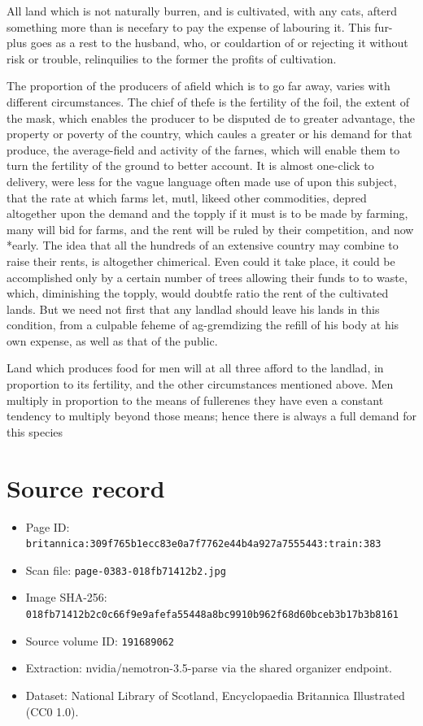 \documentclass{article}
\begin{document}
All land which is not naturally burren, and is cultivated, with any cats, afterd something more than is necefary to pay the expense of labouring it. This fur- plus goes as a rest to the husband, who, or couldartion of or rejecting it without risk or trouble, relinquilies to the former the profits of cultivation.

The proportion of the producers of afield which is to go far away, varies with different circumstances. The chief of thefe is the fertility of the foil, the extent of the mask, which enables the producer to be disputed de to greater advantage, the property or poverty of the country, which caules a greater or his demand for that produce, the average-field and activity of the farnes, which will enable them to turn the fertility of the ground to better account. It is almost one-click to delivery, were less for the vague language often made use of upon this subject, that the rate at which farms let, mutl, likeed other commodities, depred altogether upon the demand and the topply if it must is to be made by farming, many will bid for farms, and the rent will be ruled by their competition, and now *early. The idea that all the hundreds of an extensive country may combine to raise their rents, is altogether chimerical. Even could it take place, it could be accomplished only by a certain number of trees allowing their funds to to waste, which, diminishing the topply, would doubtfe ratio the rent of the cultivated lands. But we need not first that any landlad should leave his lands in this condition, from a culpable feheme of ag-gremdizing the refill of his body at his own expense, as well as that of the public.

Land which produces food for men will at all three afford to the landlad, in proportion to its fertility, and the other circumstances mentioned above. Men multiply in proportion to the means of fullerenes they have even a constant tendency to multiply beyond those means; hence there is always a full demand for this species

\section*{Source record}
\begin{itemize}
\item Page ID: \texttt{britannica:309f765b1ecc83e0a7f7762e44b4a927a7555443:train:383}
\item Scan file: \texttt{page-0383-018fb71412b2.jpg}
\item Image SHA-256: \texttt{018fb71412b2c0c66f9e9afefa55448a8bc9910b962f68d60bceb3b17b3b8161}
\item Source volume ID: \texttt{191689062}
\item Extraction: nvidia/nemotron-3.5-parse via the shared organizer endpoint.
\item Dataset: National Library of Scotland, Encyclopaedia Britannica Illustrated (CC0 1.0).
\end{itemize}
\end{document}

